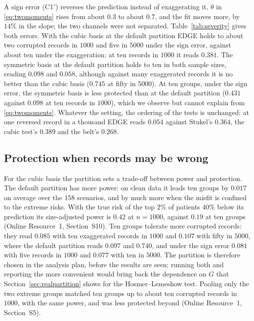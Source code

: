 A sign error (C1$'$) reverses the prediction instead of exaggerating it, $\theta$ in
\eqref{eq:twomoments} rises from about $0.3$ to about $0.7$, and the fit moves more, by $14\%$ in the
slope; the two channels were not separated. Table~\ref{tab:severity} gives both errors. With the cubic basis at the default partition EDGE
holds to about two corrupted records in $1000$ and five in $5000$ under the sign error, against about
ten under the exaggeration: at ten records in $1000$ it reads $0.381$. The symmetric basis at the
default partition holds to ten in both sample sizes, reading $0.098$ and $0.058$, although against many
exaggerated records it is no better than the cubic basis ($0.745$ at fifty in $5000$). At ten groups,
under the sign error, the symmetric basis is less protected than at the default partition ($0.431$
against $0.098$ at ten records in $1000$), which we observe but cannot explain from
\eqref{eq:twomoments}. Whatever the setting, the ordering of the tests is unchanged: at one reversed
record in a thousand EDGE reads $0.054$ against Stukel's $0.364$, the cubic test's $0.389$ and the belt's
$0.268$.



\subsection{Protection when records may be wrong}\label{sec:edgefr}

For the cubic basis the partition sets a trade-off between power and protection. The default
partition has more power: on clean data it leads ten groups by $0.017$ on average over the $158$
scenarios, and by much more when the misfit is confined to the extreme risks. With the true risk of the
top $2\%$ of patients $40\%$ below its prediction its size-adjusted power is $0.42$ at $n=1000$, against
$0.19$ at ten groups (Online Resource~1, Section~S10). Ten groups tolerate more corrupted records: they
read $0.085$ with ten exaggerated records in $1000$ and $0.107$ with fifty in $5000$, where the default
partition reads $0.097$ and $0.740$, and under the sign error $0.081$ with five records in $1000$ and
$0.077$ with ten in $5000$. The partition is therefore chosen in the analysis plan, before the results
are seen: running both and reporting the more convenient would bring back the dependence on $G$ that
Section~\ref{sec:realpartition} shows for the Hosmer--Lemeshow test. Pooling only the two extreme groups
matched ten groups up to about ten corrupted records in $1000$, with the same power, and was less
protected beyond (Online Resource~1, Section~S5).

